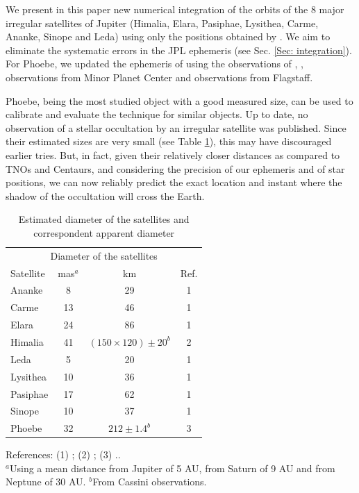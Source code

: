 \documentclass[useAMS,usenatbib]{mn2e}
\begin{document}
We present in this paper new numerical integration of the orbits of the 8 major irregular satellites of Jupiter (Himalia, Elara, Pasiphae, Lysithea, Carme, Ananke, Sinope and Leda) using only the positions obtained by \cite{GomesJunior2015}. We aim to eliminate the systematic errors in the JPL ephemeris (see Sec. \ref{Sec: integration}). %
For Phoebe, we updated the ephemeris of \cite{Desmars2013} using the observations of \cite{GomesJunior2015}, \cite{Peng2015}, observations from Minor Planet Center and observations from Flagstaff. 

Phoebe, being the most studied object with a good measured size, can be used to calibrate and evaluate the technique for similar objects. Up to date, no observation of a stellar occultation by an irregular satellite was published. Since their estimated sizes are very small (see Table \ref{Tab: satellite-diameter}), this may have discouraged earlier tries. But, in fact, given their relatively closer distances as compared to TNOs and Centaurs, and considering the precision of our ephemeris and of star positions, we can now reliably predict the exact location and instant where the shadow of the occultation will cross the Earth.

\begin{table}
\caption{\label{Tab: satellite-diameter} Estimated diameter of the satellites and correspondent apparent diameter}
\begin{center}
\begin{tabular}{lccc}
\hline  \hline
\multicolumn{4}{c}{Diameter of the satellites} \tabularnewline
Satellite  & mas$^ {a}$  & km & Ref. \tabularnewline
\hline
Ananke & 8 & 29 & 1 \tabularnewline
Carme & 13 & 46 & 1 \tabularnewline
Elara & 24 & 86 & 1 \tabularnewline
Himalia & 41 & $(150\times120) \pm 20^{b}$ & 2 \tabularnewline
Leda & 5 & 20 & 1 \tabularnewline
Lysithea & 10 & 36 & 1 \tabularnewline
Pasiphae & 17 & 62 & 1 \tabularnewline
Sinope & 10 & 37 & 1 \tabularnewline
\hdashline
Phoebe & 32 & $212 \pm 1.4^{b}$ & 3 \tabularnewline
\hline
\end{tabular}
\end{center}
References: (1) \cite{Rettig2001}; (2) \cite{Porco2003}; (3) \cite{Thomas2010}..\\
$^{a}${Using a mean distance from Jupiter of 5 AU, from Saturn of 9 AU and from Neptune of 30 AU.}
$^{b}${From Cassini observations.}
\par
\end{table}
\end{document}
